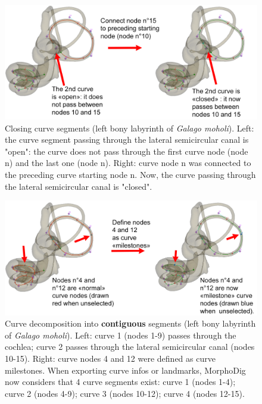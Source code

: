 \begin{figure}
  \centering
  \includegraphics[scale=0.23]{images/10/connect_node_to_preceding_starting_point.png} 
	\caption{Closing curve segments (left bony labyrinth of \textit{Galago moholi}). Left: the curve segment passing through the lateral semicircular canal is "open": the curve does not pass through the first curve node (node n) and the last one (node n). Right: curve node n was connected to the preceding curve starting node n. Now, the curve passing through the lateral semicircular canal is "closed".}
\label{connect_to_preceding_starting_node}
\end{figure}

\begin{figure}
  \centering
  \includegraphics[scale=0.23]{images/10/curve_milestones.png} 
	\caption{Curve decomposition into \textbf{contiguous} segments (left bony labyrinth of \textit{Galago moholi}). Left: curve 1 (nodes 1-9) passes through the cochlea; curve 2 passes through the lateral semicircular canal (nodes 10-15). Right: curve nodes 4 and 12 were defined as curve milestones. When exporting curve infos or landmarks, MorphoDig now considers that 4 curve segments exist: curve 1 (nodes 1-4); curve 2 (nodes 4-9); curve 3 (nodes 10-12); curve 4 (nodes 12-15).}
\label{curve_milestone}
\end{figure}

